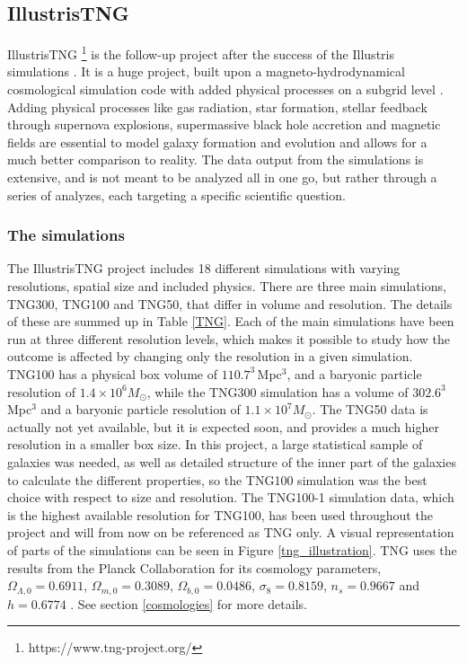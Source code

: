 \subsection{IllustrisTNG}
IllustrisTNG \footnote{https://www.tng-project.org/} is the follow-up project after the success of the Illustris simulations \parencite{Springel2017, Pillepich2017,Naiman2018, Nelson2017, Marinacci2018}. It is a huge project, built upon a magneto-hydrodynamical cosmological simulation code with added physical processes on a subgrid level \parencite{Weinberger2016}. Adding physical processes like gas radiation, star formation, stellar feedback through supernova explosions, supermassive black hole accretion and magnetic fields are essential to model galaxy formation and evolution and allows for a much better comparison to reality. The data output from the simulations is extensive, and is not meant to be analyzed all in one go, but rather through a series of analyzes, each targeting a specific scientific question. 


\subsubsection{The simulations}
The IllustrisTNG project includes 18 different simulations with varying resolutions, spatial size and included physics. There are three main simulations, TNG300, TNG100 and TNG50, that differ in volume and resolution. The details of these are summed up in Table \ref{TNG}. Each of the main simulations have been run at three different resolution levels, which makes it possible to study how the outcome is affected by changing only the resolution in a given simulation. TNG100 has a physical box volume of $110.7^3 \, $Mpc$^3$, and a baryonic particle resolution of $1.4 \times 10^6 M_{\odot}$, while the TNG300 simulation has a volume of $302.6^3 \, $Mpc$^3$ and a baryonic particle resolution of $1.1 \times 10^7 M_{\odot}$. The TNG50 data is actually not yet available, but it is expected soon, and provides a much higher resolution in a smaller box size. In this project, a large statistical sample of galaxies was needed, as well as detailed structure of the inner part of the galaxies to calculate the different properties, so the TNG100 simulation was the best choice with respect to size and resolution. The TNG100-1 simulation data, which is the highest available resolution for TNG100, has been used throughout the project and will from now on be referenced as TNG only. A visual representation of parts of the simulations can be seen in Figure \ref{tng_illustration}. TNG uses the results from the Planck Collaboration for its cosmology parameters, $\Omega_{\Lambda,0} = 0.6911$, $\Omega_{m,0}=0.3089$, $\Omega_{b,0}=0.0486$, $\sigma_8=0.8159$, $n_s=0.9667$ and $h = 0.6774$ \parencite{Planck2016}. See section \ref{cosmologies} for more details.

